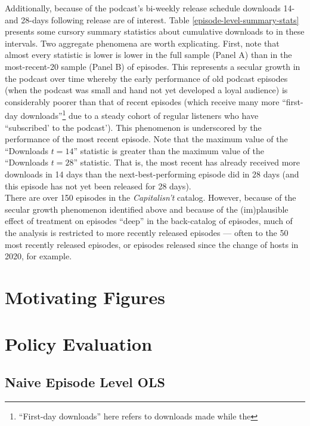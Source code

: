 \documentclass[11pt, letterpaper, twoside]{article}
\begin{document}
Additionally, because of the podcast's bi-weekly release schedule downloads 14- and 28-days following release are of interest. Table \ref{episode-level-summary-stats} presents some cursory summary statistics about cumulative downloads to in these intervals. Two aggregate phenomena are worth explicating. First, note that almost every statistic is lower is lower in the full sample (Panel A) than in the most-recent-20 sample (Panel B) of episodes. This represents a secular growth in the podcast over time whereby the early performance of old podcast episodes (when the podcast was small and hand not yet developed a loyal audience) is considerably poorer than that of recent episodes (which receive many more ``first-day downloads''\footnote{``First-day downloads'' here refers to downloads made while the } due to a steady cohort of regular listeners who have ``subscribed' to the podcast'). This phenomenon is underscored by the performance of the most recent episode. Note that the maximum value of the ``Downloads $t=14$'' statistic is greater than the maximum value of the ``Downloads $t=28$'' statistic. That is, the most recent has already received more downloads in 14 days than the next-best-performing episode did in 28 days (and this episode has not yet been released for 28 days).\\



There are over 150 episodes in the \textit{Capitalisn't} catalog. However, because of the secular growth phenomenon identified above and because of the (im)plausible effect of treatment on episodes ``deep'' in the back-catalog of episodes, much of the analysis is restricted to more recently released episodes --- often to the 50 most recently released episodes, or episodes released since the change of hosts in 2020, for example.

\section{Motivating Figures}

\section{Policy Evaluation}
\subsection{Naive Episode Level OLS}
\end{document}
